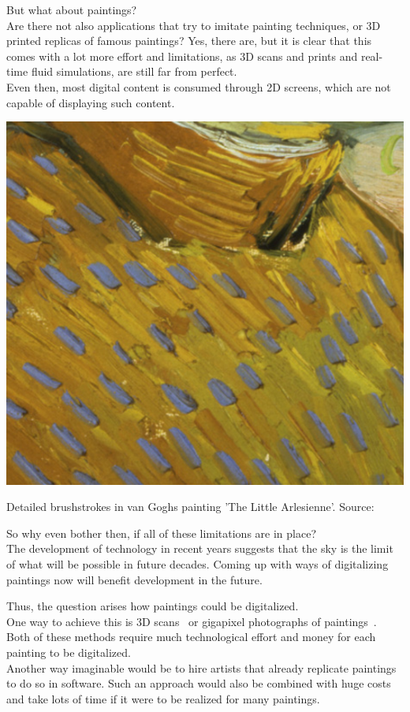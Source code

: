But what about paintings?\\
Are there not also applications that try to imitate painting techniques, or 3D printed replicas of famous paintings?
Yes, there are, but it is clear that this comes with a lot more effort and limitations, as 3D scans and prints and real-time fluid simulations, are still far from perfect.\\
Even then, most digital content is consumed through 2D screens, which are not capable of displaying such content.
\begin{marginfigure}
    \includegraphics{images/cutout_orig}%
    \caption{Detailed brushstrokes in van Goghs painting 'The Little Arlesienne'. Source:~\cite{rhythmic}}
\end{marginfigure}

So why even bother then, if all of these limitations are in place?\\
The development of technology in recent years suggests that the sky is the limit of what will be possible in future decades.
Coming up with ways of digitalizing paintings now will benefit development in the future.

Thus, the question arises how paintings could be digitalized.\\
One way to achieve this is 3D scans~\cite{3Dscan_art, 3Dscan_thesis} or gigapixel photographs of paintings~\cite{googleartproject}.
Both of these methods require much technological effort and money for each painting to be digitalized.\\
Another way imaginable would be to hire artists that already replicate paintings to do so in software.
Such an approach would also be combined with huge costs and take lots of time if it were to be realized for many paintings.

